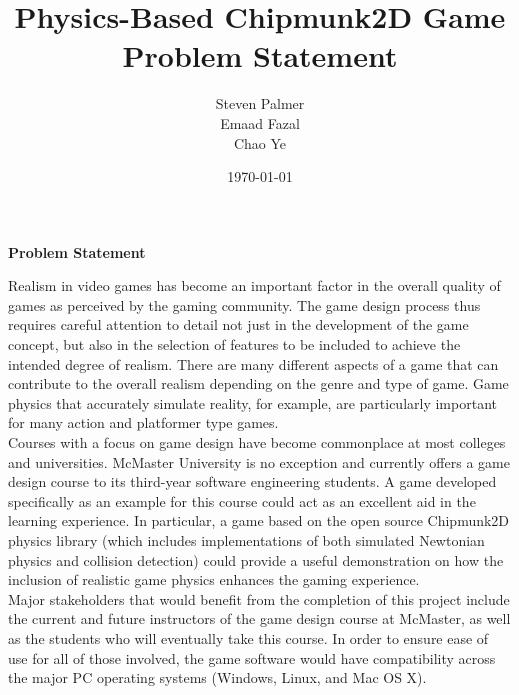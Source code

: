 \documentclass[12pt, titlepage]{article}
\begin{document}
\title{\bf Physics-Based Chipmunk2D Game\\[\baselineskip]\Large Problem Statement}
\author{Steven Palmer\\Emaad Fazal\\Chao Ye}
\date{\today}
	
\maketitle

\begin{center}
\Large \bf Problem Statement
\end{center}

Realism in video games has become an important factor in the overall quality of games as perceived by the gaming community.  The game design process thus requires careful attention to detail not just in the development of the game concept, but also in the selection of features to be included to achieve the intended degree of realism.  There are many different aspects of a game that can contribute to the overall realism depending on the genre and type of game.  Game physics that accurately simulate reality, for example, are particularly important for many action and platformer type games.\\

Courses with a focus on game design have become commonplace at most colleges and universities.  McMaster University is no exception and currently offers a game design course to its third-year software engineering students.  A game developed specifically as an example for this course could act as an excellent aid in the learning experience.  In particular, a game based on the open source Chipmunk2D physics library (which includes implementations of both simulated Newtonian physics and collision detection) could provide a useful demonstration on how the inclusion of realistic game physics enhances the gaming experience.\\

Major stakeholders that would benefit from the completion of this project include the current and future instructors of the game design course at McMaster, as well as the students who will eventually take this course.  In order to ensure ease of use for all of those involved, the game software would have compatibility across the major PC operating systems (Windows, Linux, and Mac OS X).
\end{document}
